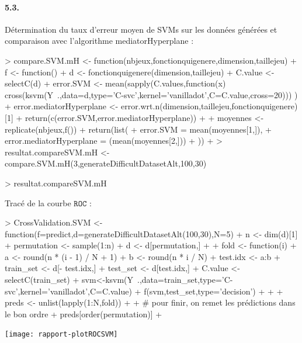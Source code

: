 \documentclass{article}
\begin{document}
\paragraph{5.3.}Détermination du taux d'erreur moyen de SVMs sur les 
données générées et comparaison avec l'algorithme mediatorHyperplane :
\begin{Schunk}
\begin{Sinput}
> compare.SVM.mH <- function(nbjeux,fonctionquigenere,dimension,taillejeu) {
+ 	f <- function() {
+ 		d <- fonctionquigenere(dimension,taillejeu)
+ 		C.value <- selectC(d)
+ 		error.SVM <- mean(sapply(C.values,function(x) cross(ksvm(Y~.,data=d,type='C-svc',kernel='vanilladot',C=C.value,cross=20))) )
+ 		error.mediatorHyperplane <- error.wrt.n(dimension,taillejeu,fonctionquigenere)[1]
+ 		return(c(error.SVM,error.mediatorHyperplane))
+ 	}
+ 	moyennes <- replicate(nbjeux,f())
+ 	return(list(
+ 		error.SVM = mean(moyennes[1,]),
+ 		error.mediatorHyperplane = (mean(moyennes[2,]))
+ 	))
+ }
> resultat.compareSVM.mH <- compare.SVM.mH(3,generateDifficultDatasetAlt,100,30)
\end{Sinput}
\end{Schunk}
\begin{Schunk}
\begin{Sinput}
> resultat.compareSVM.mH
\end{Sinput}
\end{Schunk}
Tracé de la courbe $\mathtt{ROC}$ :
\begin{Schunk}
\begin{Sinput}
> CrossValidation.SVM <- function(f=predict,d=generateDifficultDatasetAlt(100,30),N=5) {
+     n <- dim(d)[1]
+     permutation <- sample(1:n)
+     d <- d[permutation,]
+ 
+     fold <- function(i) {
+         a <- round(n * (i - 1) / N + 1)
+         b <- round(n * i / N)
+         test.idx <- a:b
+         train_set <- d[- test.idx,]
+         test_set <- d[test.idx,]
+         C.value <- selectC(train_set)
+         svm<-ksvm(Y~.,data=train_set,type='C-svc',kernel='vanilladot',C=C.value) 
+         f(svm,test_set,type='decision')
+     }
+ 
+     preds <- unlist(lapply(1:N,fold))
+     
+     # pour finir, on remet les prédictions dans le bon ordre
+     preds[order(permutation)]
+ }
\end{Sinput}
\end{Schunk}
\begin{Schunk}
\end{Schunk}
\texttt{[image: rapport-plotROCSVM]}
\end{document}
